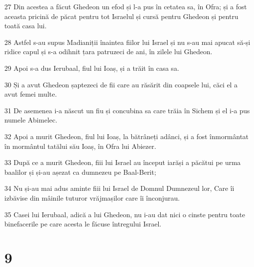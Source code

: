 \par 27 Din acestea a făcut Ghedeon un efod și l-a pus în cetatea sa, în Ofra; și a fost aceasta pricină de păcat pentru tot Israelul și cursă pentru Ghedeon și pentru toată casa lui.
\par 28 Astfel s-au supus Madianiții înaintea fiilor lui Israel și nu s-au mai apucat să-și ridice capul și s-a odihnit țara patruzeci de ani, în zilele lui Ghedeon.
\par 29 Apoi s-a dus Ierubaal, fiul lui Ioaș, și a trăit în casa sa.
\par 30 Și a avut Ghedeon șaptezeci de fii care au răsărit din coapsele lui, căci el a avut femei multe.
\par 31 De asemenea i-a născut un fiu și concubina sa care trăia în Sichem și el i-a pus numele Abimelec.
\par 32 Apoi a murit Ghedeon, fiul lui Ioaș, la bătrâneți adânci, și a fost înmormântat în mormântul tatălui său Ioaș, în Ofra lui Abiezer.
\par 33 După ce a murit Ghedeon, fiii lui Israel au început iarăși a păcătui pe urma baalilor și și-au așezat ca dumnezeu pe Baal-Berit;
\par 34 Nu și-au mai adus aminte fiii lui Israel de Domnul Dumnezeul lor, Care îi izbăvise din mâinile tuturor vrăjmașilor care îi înconjurau.
\par 35 Casei lui Ierubaal, adică a lui Ghedeon, nu i-au dat nici o cinste pentru toate binefacerile pe care acesta le făcuse întregului Israel.

\chapter{9}


